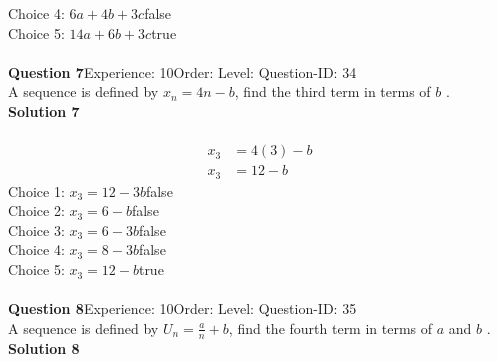\documentclass{article}
\begin{document}
Choice 4: \hspace{20pt}$6a+4b+3c$\hspace{20pt}false\\
Choice 5: \hspace{20pt}$14a+6b+3c$\hspace{20pt}true\\
\\[4pt]
\noindent\textbf{Question 7}\hspace{20pt}Experience: 10\hspace{20pt}Order: \hspace{20pt}Level: \hspace{20pt}Question-ID: 34\\[2pt]
A sequence is defined by $x_n=4n-b$, find the third term in terms of $b$ .\\[4pt]
\noindent\textbf{Solution 7}\\[2pt]
\\[-35pt]\begin{align*}
x_3&=4(3)-b\\
x_3&=12-b
\end{align*}
Choice 1: \hspace{20pt}$x_3=12-3b$\hspace{20pt}false\\
Choice 2: \hspace{20pt}$x_3=6-b$\hspace{20pt}false\\
Choice 3: \hspace{20pt}$x_3=6-3b$\hspace{20pt}false\\
Choice 4: \hspace{20pt}$x_3=8-3b$\hspace{20pt}false\\
Choice 5: \hspace{20pt}$x_3=12-b$\hspace{20pt}true\\
\\[4pt]
\noindent\textbf{Question 8}\hspace{20pt}Experience: 10\hspace{20pt}Order: \hspace{20pt}Level: \hspace{20pt}Question-ID: 35\\[2pt]
A sequence is defined by $U_n=\displaystyle\frac{a}{n}+b$, find the fourth term in terms of $a$ and $b$ .\\[4pt]
\noindent\textbf{Solution 8}\\[2pt]
\end{document}
